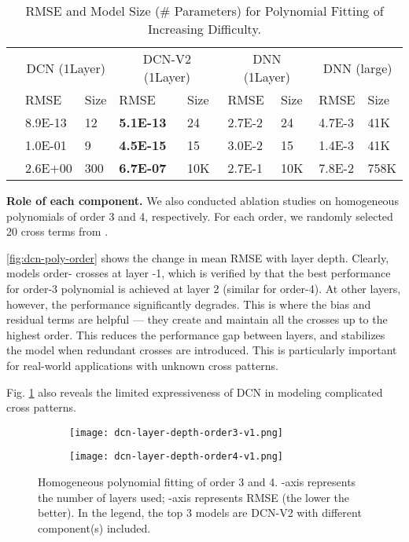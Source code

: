 \documentclass[sigconf]{acmart}
\begin{document}
\begin{table}[htpb]
\footnotesize
\vspace{-5pt}
\caption{RMSE and Model Size (\# Parameters) for Polynomial Fitting of Increasing Difficulty.}
\vspace{-3.5ex}
\label{tab:2nd-order}
\begin{center}
\begin{tabular}{c|ll|ll|ll|ll}
\toprule
& \multicolumn{2}{c|}{DCN (1Layer)}  & \multicolumn{2}{c|}{DCN-V2 (1Layer)}  & \multicolumn{2}{c|}{DNN (1Layer)} & \multicolumn{2}{c}{DNN (large)}\\
& RMSE & Size & RMSE & Size & RMSE & Size & RMSE & Size \\
\midrule
& 8.9E-13 & 12 & {\bf 5.1E-13} & 24 & 2.7E-2 & 24  & 4.7E-3 & 41K 
\\
 & 1.0E-01 & 9  & {\bf 4.5E-15} & 15 & 3.0E-2 & 15 & 1.4E-3 & 41K\\
 & 2.6E+00 & 300 & {\bf 6.7E-07} & 10K & 2.7E-1 & 10K & 7.8E-2 & 758K\\
\bottomrule
\end{tabular}
\end{center}
\vspace{-5pt}
\end{table}

{\bf Role of each component.}
We also conducted ablation studies on homogeneous polynomials of order 3 and 4, respectively. For each order, we randomly selected 20 cross terms from .

\autoref{fig:dcn-poly-order} shows the change in mean RMSE with layer depth. Clearly,  models order- crosses at layer -1, which is verified by that the best performance for order-3 polynomial is achieved at layer 2 (similar for order-4). At other layers, however, the performance significantly degrades. This is where the bias and residual terms are helpful --- they create and maintain all the crosses up to the highest order. This reduces the performance gap between layers, and stabilizes the model when redundant crosses are introduced. This is particularly important for real-world applications with unknown cross patterns.

Fig. \ref{fig:dcn-poly-order} also reveals the limited expressiveness of {DCN} in modeling complicated cross patterns.


\begin{figure}[htbp]
\centering
    \begin{subfigure}[b]{0.22\textwidth}  
    \texttt{[image: dcn-layer-depth-order3-v1.png]}
    \end{subfigure}
    \hfill
    \begin{subfigure}[b]{0.208\textwidth}  
    \texttt{[image: dcn-layer-depth-order4-v1.png]}
    \end{subfigure}
    \vspace{-1ex}
    \caption{Homogeneous polynomial fitting of order 3 and 4. -axis represents the number of layers used; -axis represents RMSE (the lower the better). In the legend, the top 3 models are {DCN-V2} with different component(s) included.}
\label{fig:dcn-poly-order}
\end{figure}
\end{document}
